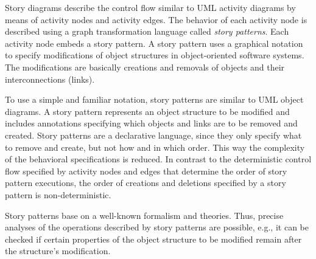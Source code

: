 Story diagrams describe the control flow similar to UML activity diagrams by means of activity nodes and activity edges.
The behavior of each activity node is described using a graph transformation language called \emph{story patterns}.
Each activity node embeds a story pattern.
A story pattern uses a graphical notation to specify modifications of object structures in object-oriented software systems.
The modifications are basically creations and removals of objects and their interconnections (links).


To use a simple and familiar notation, story patterns are similar to UML object diagrams.
A story pattern represents an object structure to be modified and includes annotations specifying which objects and links are to be removed and created.
Story patterns are a declarative language, since they only specify what to remove and create, but not how and in which order.
This way the complexity of the behavioral specifications is reduced.
In contrast to the deterministic control flow specified by activity nodes and edges that determine the order of story pattern executions,
the order of creations and deletions specified by a story pattern is non-deterministic.


Story patterns base on a well-known formalism and theories.
Thus, precise analyses of the operations described by story patterns are possible,
e.g., it can be checked if certain properties of the object structure to be modified remain after the structure's modification.


